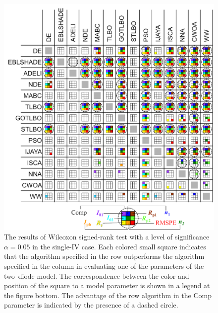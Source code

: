 \documentclass[a4paper,fleqn]{cas-dc}
\begin{document}
\begin{figure}[]
	\centering
		\includegraphics[width=1.0\columnwidth]{Fig4}
	  \caption{The results of Wilcoxon signed-rank test with a level of significance $\alpha = 0.05$ in the single-IV case.
               Each colored small square indicates that the algorithm specified in the row outperforms the algorithm
               specified in the column in evaluating one of the parameters of the two--diode model.
               The correspondence between the color and position of the square to a model parameter
               is shown in a legend at the figure bottom.
               The advantage of the row algorithm in the Comp parameter is indicated by the presence of a dashed circle.}\label{figWilSingleIV}
\end{figure}
\end{document}
